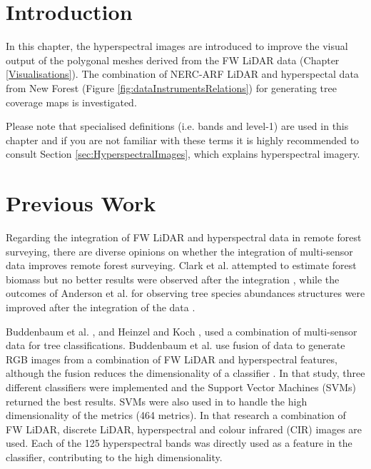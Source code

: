 \documentclass{subfiles}
\begin{document}
	
	\section{Introduction}	
	\par In this chapter, the hyperspectral images are introduced to improve the visual output of the polygonal meshes derived from the FW LiDAR data (Chapter \ref{Visualisations}).  The combination of NERC-ARF LiDAR and hyperspectal data from New Forest (Figure \ref{fig:dataInstrumentsRelations}) for generating tree coverage maps is investigated.
	
    Please note that specialised definitions (i.e. bands and level-1) are used in this chapter and if you are not familiar with these terms it is highly recommended to consult Section \ref{sec:HyperspectralImages}, which explains hyperspectral imagery.
	
	\section{Previous Work}
	
	\par Regarding the integration of FW LiDAR and hyperspectral data in remote forest surveying, there are diverse opinions on whether the integration of multi-sensor data improves remote forest surveying. Clark et al. attempted to estimate forest biomass but no better results were observed after the integration \cite{Clark2011}, while the outcomes of Anderson et al. for observing tree species abundances structures were improved after the integration of the data \cite{Anderson2008}. 
	
	\par  Buddenbaum et al. \cite{Buddenbaum2013}, and Heinzel and Koch \cite{Heinzel2012}, used a combination of multi-sensor data for tree classifications. Buddenbaum et al. use fusion of data to generate RGB images from a combination of FW LiDAR and hyperspectral features, although the fusion reduces the dimensionality of a classifier \cite{Buddenbaum2013}. In that study, three different classifiers were implemented and the Support Vector Machines (SVMs) returned the best results. SVMs were also used in \cite{Heinzel2012} to handle the high dimensionality of the metrics (464 metrics). In that research a combination of FW LiDAR, discrete LiDAR, hyperspectral and colour infrared (CIR) images are used. Each of the 125 hyperspectral bands was directly used as a feature in the classifier, contributing to the high dimensionality. 
 
\end{document}
